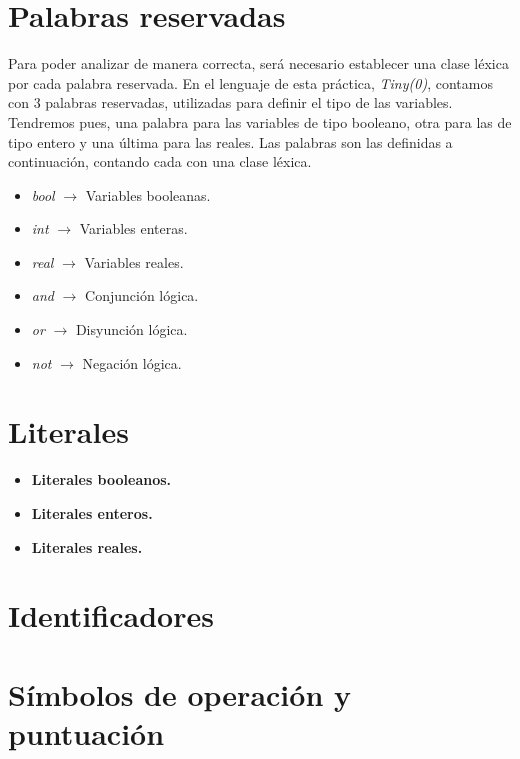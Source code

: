 
\section{Palabras reservadas}

Para poder analizar de manera correcta, será necesario establecer una clase léxica por cada palabra reservada. En el lenguaje de
esta práctica, \textit{Tiny(0)}, contamos con 3 palabras reservadas, utilizadas para definir el tipo de las variables. Tendremos pues,
una palabra para las variables de tipo booleano, otra para las de tipo entero y una última para las reales. Las palabras son 
las definidas a continuación, contando cada con una clase léxica.

\begin{itemize}
    \item \textit{bool} $\rightarrow$ Variables booleanas.
    \item \textit{int} $\rightarrow$ Variables enteras.
    \item \textit{real} $\rightarrow$ Variables reales.
    \item \textit{and} $\rightarrow$ Conjunción lógica.
    \item \textit{or} $\rightarrow$ Disyunción lógica.
    \item \textit{not} $\rightarrow$ Negación lógica.
\end{itemize}

\section{Literales}

\begin{itemize}
    \item \textbf{Literales booleanos.}
    \item \textbf{Literales enteros.}
    \item \textbf{Literales reales.}
\end{itemize}

\section{Identificadores}

\section{Símbolos de operación y puntuación}

